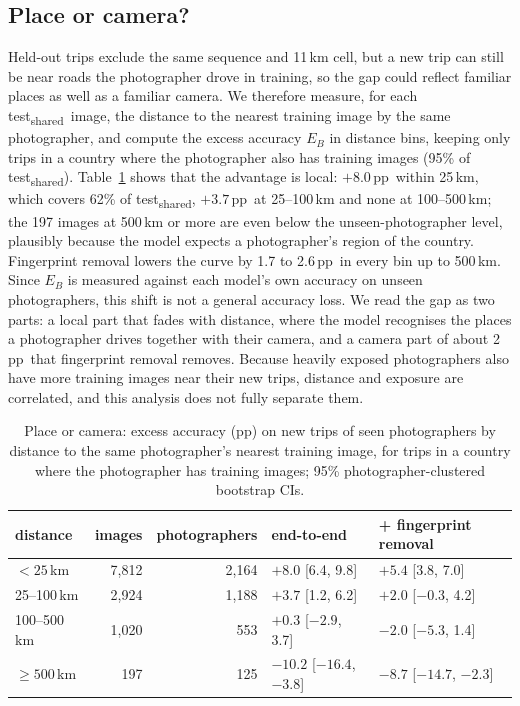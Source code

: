 \documentclass[11pt]{article}
\newcommand{\tsh}{test\textsubscript{shared}}
\newcommand{\pp}{\,pp}
\begin{document}
\subsection{Place or camera?}\label{sec:place}
Held-out trips exclude the same sequence and 11\,km cell, but a new trip can still be near roads the photographer drove in training, so the gap could reflect familiar places as well as a familiar camera. We therefore measure, for each \tsh\ image, the distance to the nearest training image by the same
photographer, and compute the excess accuracy $E_B$ in distance bins, keeping only trips in a country where
the photographer also has training images (95\% of \tsh). Table~\ref{tab:place} shows that the advantage is
local: $+8.0$\pp\ within 25\,km, which covers 62\% of \tsh, $+3.7$\pp\ at 25--100\,km and none at
100--500\,km; the 197 images at 500\,km or more are even below the unseen-photographer level, plausibly
because the model expects a photographer's region of the country. Fingerprint removal lowers the curve by
1.7 to 2.6\pp\ in every bin up to 500\,km. Since $E_B$ is measured against each model's own accuracy
on unseen photographers, this shift is not a general accuracy loss. We read the gap as two parts: a local
part that fades with distance, where the model recognises the places a photographer drives together with
their camera, and a camera part of about 2\pp\ that fingerprint removal removes. Because heavily exposed
photographers also have more training images near their new trips, distance and exposure are correlated,
and this analysis does not fully separate them.

\begin{table}[!htbp]
\centering\small
\caption{Place or camera: excess accuracy (pp) on new trips of seen photographers by distance to the same
photographer's nearest training image, for trips in a country where the photographer has training images;
95\% photographer-clustered bootstrap CIs.}
\label{tab:place}
\begin{tabular}{@{}lrrll@{}}
\toprule
distance & images & photographers & end-to-end & + fingerprint removal \\
\midrule
$<25$\,km & 7{,}812 & 2{,}164 & $+8.0$ [6.4, 9.8] & $+5.4$ [3.8, 7.0] \\
25--100\,km & 2{,}924 & 1{,}188 & $+3.7$ [1.2, 6.2] & $+2.0$ [$-0.3$, 4.2] \\
100--500\,km & 1{,}020 & 553 & $+0.3$ [$-2.9$, 3.7] & $-2.0$ [$-5.3$, 1.4] \\
$\geq500$\,km & 197 & 125 & $-10.2$ [$-16.4$, $-3.8$] & $-8.7$ [$-14.7$, $-2.3$] \\
\bottomrule
\end{tabular}
\end{table}
\end{document}
